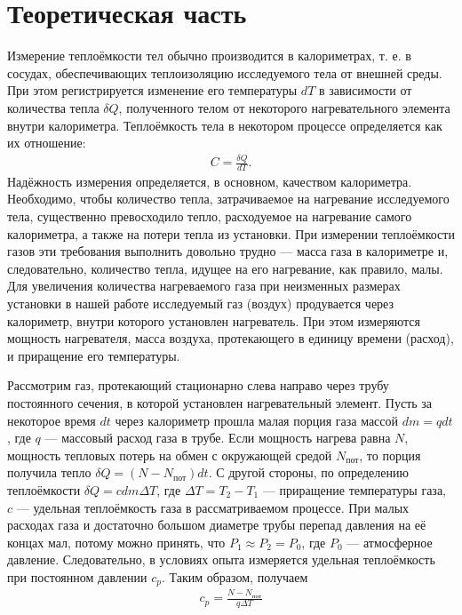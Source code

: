 \documentclass[a4paper, fontsize=14pt]{article}
\begin{document}
\section*{Теоретическая часть}
Измерение теплоёмкости тел обычно производится в калориметрах, т. е. в
сосудах, обеспечивающих теплоизоляцию исследуемого тела от внешней
среды. При этом регистрируется изменение его температуры $dT$ в зависимости от количества тепла $\delta Q$, полученного телом от некоторого нагревательного элемента внутри калориметра. Теплоёмкость тела в некотором процессе определяется как их отношение:
\begin{align}
	C = \frac{\delta Q}{dT}.
\end{align}
Надёжность измерения определяется, в основном, качеством калориметра.
Необходимо, чтобы количество тепла, затрачиваемое на нагревание исследуемого тела, существенно превосходило тепло, расходуемое на нагревание самого калориметра, а также на потери тепла из установки. При измерении теплоёмкости газов эти требования выполнить довольно трудно — масса газа в калориметре и, следовательно, количество тепла, идущее на его нагревание, как правило, малы. Для увеличения количества нагреваемого газа при неизменных размерах установки в нашей работе исследуемый газ (воздух) продувается через калориметр, внутри которого установлен нагреватель. При этом измеряются мощность нагревателя, масса воздуха, протекающего в единицу времени (расход), и приращение его температуры.

Рассмотрим газ, протекающий стационарно слева направо через
трубу постоянного сечения, в которой установлен нагревательный элемент. Пусть за некоторое
время $dt$ через калориметр прошла малая порция газа массой $dm = q dt$, где $q$ --- массовый расход газа в трубе. Если мощность нагрева равна $N$, мощность тепловых потерь на обмен с окружающей средой $N_{\text{пот}}$, то порция получила тепло $\delta Q = (N - N_{\text{пот}})dt$. С другой стороны, по определению теплоёмкости $\delta Q = c dm \Delta T$, где $\Delta T = T_2 - T_1$ --- приращение температуры газа, $c$ --- удельная теплоёмкость газа в рассматриваемом процессе. При малых расходах газа и достаточно большом диаметре трубы перепад давления на её концах мал, потому можно принять, что $P_1 \approx P_2 = P_0$, где $P_0$ --- атмосферное давление. Следовательно, в условиях опыта измеряется удельная теплоёмкость при постоянном давлении $c_p$. Таким образом, получаем
\begin{align}
	c_p = \frac{N - N_{\text{пот}}}{q \Delta T}
\end{align}
\end{document}
